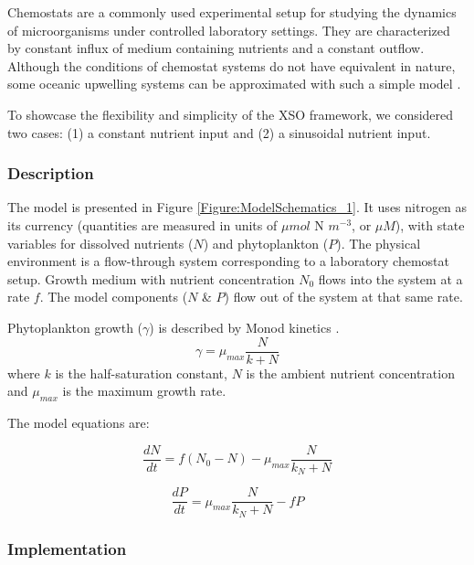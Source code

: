 \documentclass[journal abbreviation, manuscript]{copernicus}
\begin{document}
Chemostats are a commonly used experimental setup for studying the dynamics of microorganisms under controlled laboratory settings. They are characterized by constant influx of medium containing nutrients and a constant outflow. Although the conditions of chemostat systems do not have equivalent in nature, some oceanic upwelling systems can be approximated with such a simple model \citep{Haefner2005ModelingApplications}.

To showcase the flexibility and simplicity of the XSO framework, we considered two cases: (1) a constant nutrient input and (2) a sinusoidal nutrient input.

\subsubsection{Description}
The model is presented in Figure \ref{Figure:ModelSchematics_1}. It uses nitrogen as its currency (quantities are measured in units of $\mu mol$ N $m^{-3}$, or $\mu M$), with state variables for dissolved nutrients ($N$) and phytoplankton ($P$). The physical environment is a flow-through system corresponding to a laboratory chemostat setup. Growth medium with nutrient concentration $N_0$ flows into the system at a rate $f$. The model components ($N$ \& $P$) flow out of the system at that same rate.

Phytoplankton growth ($\gamma$) is described by Monod kinetics \citep{Monod1942RecherchesBacteriennes}.
\begin{equation}
    \gamma = \mu_{max} \frac{N}{k + N} 
\end{equation}
where $k$ is the half-saturation constant, $N$ is the ambient nutrient concentration and $\mu_{max}$ is the maximum growth rate.

The model equations are:

\begin{equation}
    \frac{d N}{d t} = 
    f (N_0 - N) %
    -  \mu_{max} \frac{N}{k_N + N} 
\end{equation}

\begin{equation}
    \frac{d P}{d t} =
    \mu_{max} \frac{N}{k_N + N} 
    - f P
\end{equation}



\subsubsection{Implementation}
\end{document}
